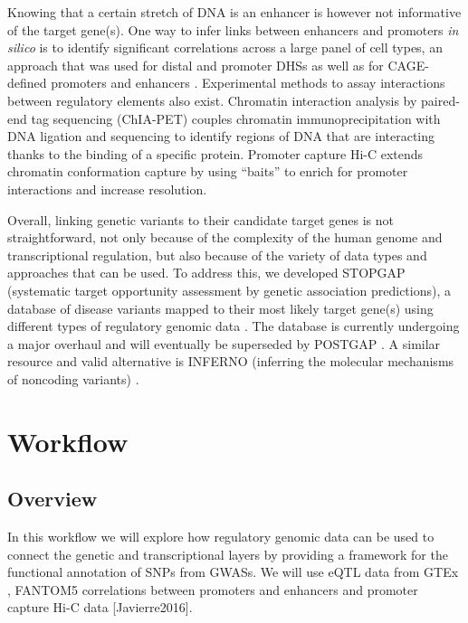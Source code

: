 \documentclass[9pt,a4paper,]{extarticle}
\begin{document}
Knowing that a certain stretch of DNA is an enhancer is however not informative of the target gene(s).
One way to infer links between enhancers and promoters \emph{in silico} is to identify significant correlations across a large panel of cell types, an approach that was used for distal and promoter DHSs \citep{Thurman2012} as well as for CAGE-defined promoters and enhancers \citep{Andersson2014}.
Experimental methods to assay interactions between regulatory elements also exist.
Chromatin interaction analysis by paired-end tag sequencing (ChIA-PET) \citep{Fullwood2009, Zhang2013} couples chromatin immunoprecipitation with DNA ligation and sequencing to identify regions of DNA that are interacting thanks to the binding of a specific protein.
Promoter capture Hi-C \citep{Mifsud2015, Javierre2016} extends chromatin conformation capture by using ``baits'' to enrich for promoter interactions and increase resolution.

Overall, linking genetic variants to their candidate target genes is not straightforward, not only because of the complexity of the human genome and transcriptional regulation, but also because of the variety of data types and approaches that can be used.
To address this, we developed STOPGAP (systematic target opportunity assessment by genetic association predictions), a database of disease variants mapped to their most likely target gene(s) using different types of regulatory genomic data \citep{Shen2017}.
The database is currently undergoing a major overhaul and will eventually be superseded by POSTGAP \citep{Ensembl2017}.
A similar resource and valid alternative is INFERNO (inferring the molecular mechanisms of noncoding variants) \citep{Amlie-Wolf2017}.

\section{Workflow}\label{workflow}

\subsection{Overview}\label{overview}

In this workflow we will explore how regulatory genomic data can be used to connect the genetic and transcriptional layers by providing a framework for the functional annotation of SNPs from GWASs.
We will use eQTL data from GTEx \citep{GTEx2017a}, FANTOM5 correlations between promoters and enhancers \citep{Andersson2014} and promoter capture Hi-C data {[}Javierre2016{]}.
\end{document}
